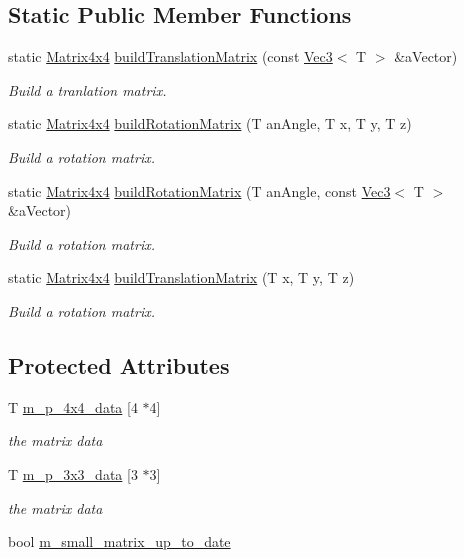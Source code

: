 \subsection*{Static Public Member Functions}
\begin{DoxyCompactItemize}
\item 
static \hyperlink{class_math_1_1_matrix4x4}{Matrix4x4} \hyperlink{class_math_1_1_matrix4x4_a3dc6224d52fda92a53c59338b21effaf}{buildTranslationMatrix} (const \hyperlink{class_math_1_1_vec3}{Vec3}$<$ T $>$ \&aVector)
\begin{DoxyCompactList}\small\item\em Build a tranlation matrix. \end{DoxyCompactList}\item 
static \hyperlink{class_math_1_1_matrix4x4}{Matrix4x4} \hyperlink{class_math_1_1_matrix4x4_a5dfc6ed59974a2df047d3e0008956085}{buildRotationMatrix} (T anAngle, T x, T y, T z)
\begin{DoxyCompactList}\small\item\em Build a rotation matrix. \end{DoxyCompactList}\item 
static \hyperlink{class_math_1_1_matrix4x4}{Matrix4x4} \hyperlink{class_math_1_1_matrix4x4_a0455e306c32ba2a215450b3e67ccf809}{buildRotationMatrix} (T anAngle, const \hyperlink{class_math_1_1_vec3}{Vec3}$<$ T $>$ \&aVector)
\begin{DoxyCompactList}\small\item\em Build a rotation matrix. \end{DoxyCompactList}\item 
static \hyperlink{class_math_1_1_matrix4x4}{Matrix4x4} \hyperlink{class_math_1_1_matrix4x4_a8acc0d5e8082cabad325ef9185e847e9}{buildTranslationMatrix} (T x, T y, T z)
\begin{DoxyCompactList}\small\item\em Build a rotation matrix. \end{DoxyCompactList}\end{DoxyCompactItemize}
\subsection*{Protected Attributes}
\begin{DoxyCompactItemize}
\item 
T \hyperlink{class_math_1_1_matrix4x4_a71124664bc0abb8d04c60f9d5aa3b223}{m\_\-p\_\-4x4\_\-data} \mbox{[}4 $\ast$4\mbox{]}
\begin{DoxyCompactList}\small\item\em the matrix data \end{DoxyCompactList}\item 
T \hyperlink{class_math_1_1_matrix4x4_a15e068c543d59c2035b2445f0199e267}{m\_\-p\_\-3x3\_\-data} \mbox{[}3 $\ast$3\mbox{]}
\begin{DoxyCompactList}\small\item\em the matrix data \end{DoxyCompactList}\item 
bool \hyperlink{class_math_1_1_matrix4x4_ab2beab6050bc7e8a170b7f2121aeefb5}{m\_\-small\_\-matrix\_\-up\_\-to\_\-date}
\end{DoxyCompactItemize}


